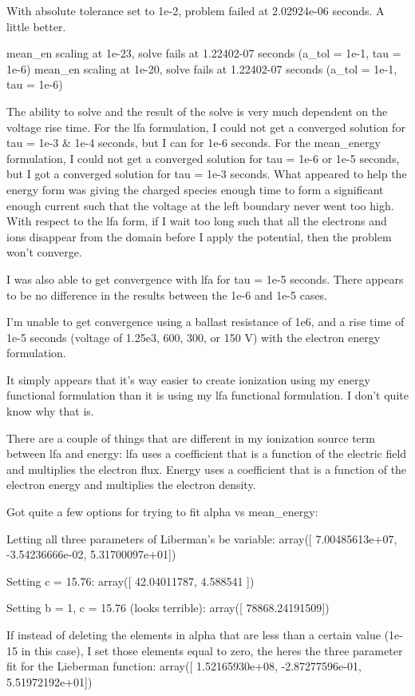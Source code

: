 {With absolute tolerance set to 1e-2, problem failed at 2.02924e-06 seconds. A little better.

mean_en scaling at 1e-23, solve fails at 1.22402-07 seconds (a_tol = 1e-1, tau = 1e-6)
mean_en scaling at 1e-20, solve fails at 1.22402-07 seconds (a_tol = 1e-1, tau = 1e-6)

The ability to solve and the result of the solve is very much dependent on the voltage rise time. For the lfa formulation, I could not get a converged solution for tau = 1e-3 & 1e-4 seconds, but I can for 1e-6 seconds. For the mean_energy formulation, I could not get a converged solution for tau = 1e-6 or 1e-5 seconds, but I got a converged solution for tau = 1e-3 seconds. What appeared to help the energy form was giving the charged species enough time to form a significant enough current such that the voltage at the left boundary never went too high. With respect to the lfa form, if I wait too long such that all the electrons and ions disappear from the domain before I apply the potential, then the problem won't converge.

I was also able to get convergence with lfa for tau = 1e-5 seconds. There appears to be no difference in the results between the 1e-6 and 1e-5 cases.

I'm unable to get convergence using a ballast resistance of 1e6, and a rise time of 1e-5 seconds (voltage of 1.25e3, 600, 300, or 150 V) with the electron energy formulation.

It simply appears that it's way easier to create ionization using my energy functional formulation than it is using my lfa functional formulation. I don't quite know why that is.

There are a couple of things that are different in my ionization source term between lfa and energy: lfa uses a coefficient that is a function of the electric field and multiplies the electron flux. Energy uses a coefficient that is a function of the electron energy and multiplies the electron density.

Got quite a few options for trying to fit alpha vs mean_energy:

Letting all three parameters of Liberman's be variable:
array([  7.00485613e+07,  -3.54236666e-02,   5.31700097e+01])

Setting c = 15.76:
array([ 42.04011787,   4.588541  ])

Setting b = 1, c = 15.76 (looks terrible):
array([ 78868.24191509])

If instead of deleting the elements in alpha that are less than a certain value (1e-15 in this case), I set those elements equal to zero, the heres the three parameter fit for the Lieberman function:
array([  1.52165930e+08,  -2.87277596e-01,   5.51972192e+01])

}
